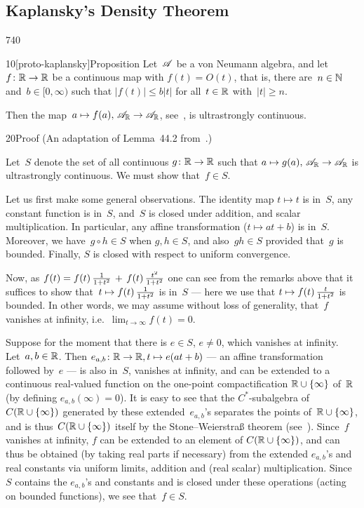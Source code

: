 \subsection{Kaplansky's Density Theorem}
\begin{parsec}{740}%
\begin{point}{10}[proto-kaplansky]{Proposition}%
Let~$\mathscr{A}$ be a von Neumann algebra,
and let~$f\colon \mathbb{R}\to\mathbb{R}$ be a continuous map 
with $f(t)=O(t)$,
that is,
there are~$n\in \mathbb{N}$ and~$b\in [0,\infty)$
such that $\left|f(t)\right|\leq b\left|t\right|$
for all~$t\in \mathbb{R}$ with~$\left|t\right| \geq n$.

Then the map~$a\mapsto f(a),\,\mathscr{A}_{\mathbb{R}}\to\mathscr{A}_{\mathbb{R}}$,
see~,
is ultrastrongly continuous.
\begin{point}{20}{Proof}%
(An adaptation of Lemma~44.2 from~\cite{conway2000}.)

Let~$S$ denote the set of all continuous $g\colon \mathbb{R}\to\mathbb{R}$
such that $a\mapsto g(a),\,\mathscr{A}_{\mathbb{R}}\to\mathscr{A}_{\mathbb{R}}$
is ultrastrongly continuous.
We must show that~$f\in S$.

Let us first make some general observations.
The identity map $t\mapsto t$ is in~$S$,
any constant function is in~$S$,
and~$S$ is closed under addition,
and scalar multiplication.
In particular, any affine transformation ($t\mapsto at+b$)
is in~$S$.
Moreover, we have~$g\circ h\in S$ when $g,h\in S$,
and also~$gh\in S$
provided that~$g$ is bounded.
Finally, $S$ is closed with respect to uniform convergence.

Now,
as $f(t)=f(t)\,\smash{\frac{1}{1+t^2}\,+\, f(t)\,\frac{t^2}{1+t^2}}$
 one can see from the remarks above
that it suffices
to show
that~$t\mapsto f(t)\,\smash{\frac{1}{1+t^2}}$ is in~$S$
--- here we use that $t\mapsto f(t) \,\smash{\frac{t}{1+t^2}}$ is bounded.
In other words,
we may assume without loss of generality,
that~$f$ vanishes at infinity, i.e.~$\lim_{t\to \infty}f(t)=0$.

Suppose for the moment
that there is $e\in S$, $e\neq 0$,
which vanishes at infinity.
Let~$a,b\in \mathbb{R}$.
Then $e_{a,b}\colon \mathbb{R}\to\mathbb{R}, t\mapsto e(at+b)$
--- an affine transformation followed by~$e$ ---
is also in~$S$,
vanishes at infinity,
and can be extended to a continuous real-valued
function on the one-point compactification $\mathbb{R}\cup \{ \infty\}$
of~$\mathbb{R}$
(by defining $e_{a,b}(\infty)=0$).
It is easy to see that the $C^*$-subalgebra
of~$C(\mathbb{R}\cup\{\infty\})$
generated by these extended~$e_{a,b}$'s 
separates the points of~$\mathbb{R}\cup\{\infty\}$,
and is thus~$C(\mathbb{R}\cup\{\infty\})$ itself
    by the Stone--Weierstra\ss{} theorem (see~).
Since~$f$ vanishes at infinity,
$f$ can be extended to an element of $C(\mathbb{R}\cup\{\infty\})$,
 and can thus be obtained
(by taking real parts if necessary)
from the extended $e_{a,b}$'s and real constants 
via uniform limits, addition and (real scalar)
multiplication. 
Since~$S$ contains the $e_{a,b}$'s and constants
and is closed under these operations (acting on bounded functions),
we see that~$f\in S$.


\end{point}
\end{point}
\end{parsec}
